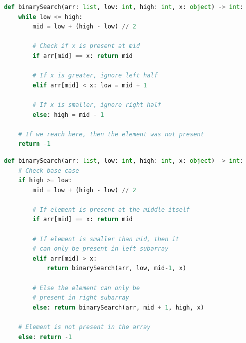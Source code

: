 \begin{lstlisting}[language=Python, caption=Binary Search (iterative) - Python]
def binarySearch(arr: list, low: int, high: int, x: object) -> int:
    while low <= high:
        mid = low + (high - low) // 2

        # Check if x is present at mid
        if arr[mid] == x: return mid

        # If x is greater, ignore left half
        elif arr[mid] < x: low = mid + 1

        # If x is smaller, ignore right half
        else: high = mid - 1

    # If we reach here, then the element was not present
    return -1
\end{lstlisting}

\begin{lstlisting}[language=Python, caption=Binary Search (recursive) - Python]
def binarySearch(arr: list, low: int, high: int, x: object) -> int:
    # Check base case
    if high >= low:
        mid = low + (high - low) // 2
        
        # If element is present at the middle itself
        if arr[mid] == x: return mid
            
        # If element is smaller than mid, then it
        # can only be present in left subarray
        elif arr[mid] > x: 
            return binarySearch(arr, low, mid-1, x)

        # Else the element can only be 
        # present in right subarray
        else: return binarySearch(arr, mid + 1, high, x)

    # Element is not present in the array
    else: return -1
\end{lstlisting}

